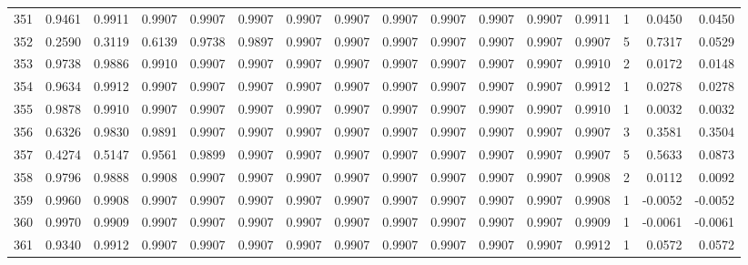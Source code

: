 \begin{tabular}{lrrrrrrrrrrrrrrr}
351 &      0.9461 &  0.9911 &  0.9907 &  0.9907 &  0.9907 &  0.9907 &  0.9907 &  0.9907 &  0.9907 &  0.9907 &   0.9907 &     0.9911 &      1 &                    0.0450 &                     0.0450 \\
352 &      0.2590 &  0.3119 &  0.6139 &  0.9738 &  0.9897 &  0.9907 &  0.9907 &  0.9907 &  0.9907 &  0.9907 &   0.9907 &     0.9907 &      5 &                    0.7317 &                     0.0529 \\
353 &      0.9738 &  0.9886 &  0.9910 &  0.9907 &  0.9907 &  0.9907 &  0.9907 &  0.9907 &  0.9907 &  0.9907 &   0.9907 &     0.9910 &      2 &                    0.0172 &                     0.0148 \\
354 &      0.9634 &  0.9912 &  0.9907 &  0.9907 &  0.9907 &  0.9907 &  0.9907 &  0.9907 &  0.9907 &  0.9907 &   0.9907 &     0.9912 &      1 &                    0.0278 &                     0.0278 \\
355 &      0.9878 &  0.9910 &  0.9907 &  0.9907 &  0.9907 &  0.9907 &  0.9907 &  0.9907 &  0.9907 &  0.9907 &   0.9907 &     0.9910 &      1 &                    0.0032 &                     0.0032 \\
356 &      0.6326 &  0.9830 &  0.9891 &  0.9907 &  0.9907 &  0.9907 &  0.9907 &  0.9907 &  0.9907 &  0.9907 &   0.9907 &     0.9907 &      3 &                    0.3581 &                     0.3504 \\
357 &      0.4274 &  0.5147 &  0.9561 &  0.9899 &  0.9907 &  0.9907 &  0.9907 &  0.9907 &  0.9907 &  0.9907 &   0.9907 &     0.9907 &      5 &                    0.5633 &                     0.0873 \\
358 &      0.9796 &  0.9888 &  0.9908 &  0.9907 &  0.9907 &  0.9907 &  0.9907 &  0.9907 &  0.9907 &  0.9907 &   0.9907 &     0.9908 &      2 &                    0.0112 &                     0.0092 \\
359 &      0.9960 &  0.9908 &  0.9907 &  0.9907 &  0.9907 &  0.9907 &  0.9907 &  0.9907 &  0.9907 &  0.9907 &   0.9907 &     0.9908 &      1 &                   -0.0052 &                    -0.0052 \\
360 &      0.9970 &  0.9909 &  0.9907 &  0.9907 &  0.9907 &  0.9907 &  0.9907 &  0.9907 &  0.9907 &  0.9907 &   0.9907 &     0.9909 &      1 &                   -0.0061 &                    -0.0061 \\
361 &      0.9340 &  0.9912 &  0.9907 &  0.9907 &  0.9907 &  0.9907 &  0.9907 &  0.9907 &  0.9907 &  0.9907 &   0.9907 &     0.9912 &      1 &                    0.0572 &                     0.0572 \\

\end{tabular}
